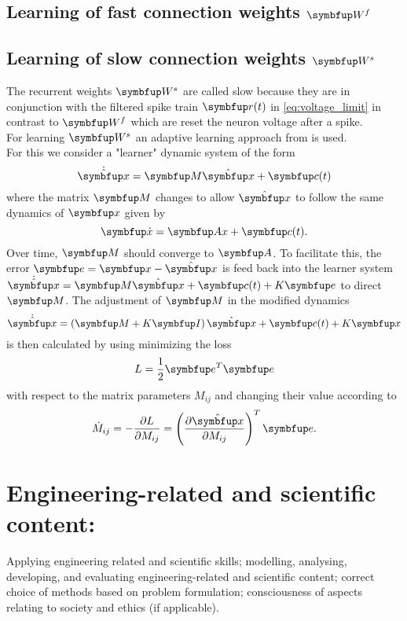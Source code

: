 \subsection{Learning of fast connection weights $\bmu{W}^f$}


\subsection{Learning of slow connection weights $\bmu{W}^s$}
The recurrent weights $\bmu{W}^s$ are called slow because they are in conjunction with the filtered spike train $\bmu{r}(t)$ in \cref{eq:voltage_limit} in contrast to $\bmu{W}^f$ which are reset the neuron voltage after a spike.\\
For learning $\bmu{W}^s$ an adaptive learning approach from \cite{bourdoukan_enforcing_nodate} is used.\\
For this we consider a "learner" dynamic system of the form
\begin{equation}
	\dot{\hat{\bmu{x}}} = \bmu{M}\hat{\bmu{x}} + \bmu{c}(t)
\end{equation}
where the matrix $\bmu{M}$ changes to allow $\hat{\bmu{x}}$ to follow the same dynamics of $\bmu{x}$ given by \begin{equation}
	\bmu{\dot{x}} = \bmu{Ax} + \bmu{c}(t).
\end{equation}
Over time, $\bmu{M}$ should converge to $\bmu{A}$. To facilitate this, the error $\bmu{e} = \bmu{x} - \hat{\bmu{x}}$ is feed back into the learner system $\dot{\hat{\bmu{x}}} =\bmu{M}\hat{\bmu{x}} + \bmu{c}(t)  + K\bmu{e}$ to direct $\bmu{M}$.
The adjustment of $\bmu{M}$ in the modified dynamics
\begin{equation}
	\dot{\hat{\bmu{x}}} = \left(\bmu{M} + K\bmu{I}\right)\hat{\bmu{x}} + \bmu{c}(t) + K\bmu{x}
\end{equation}
is then calculated by using minimizing the loss
\begin{equation}
	L = \frac{1}{2}\bmu{e}^T\bmu{e}
\end{equation}
with respect to the matrix parameters $M_{ij}$ and changing their value according to
\begin{equation}
	\dot{M}_{ij} = -\frac{\partial L}{\partial M_{ij}} = \left(\frac{\partial \hat{\bmu{x}}}{\partial M_{ij}}\right)^T\bmu{e}.
\end{equation}


\section{Engineering-related and scientific content:}
Applying engineering related and scientific skills; modelling, analysing, developing, and evaluating engineering-related and scientific content; correct choice of methods based on problem formulation; consciousness of aspects relating to society and ethics (if applicable).

